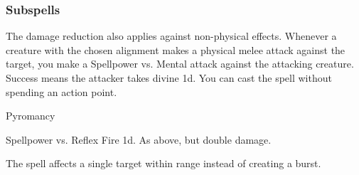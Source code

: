 \subsubsection{Subspells}
The damage reduction also applies against non-physical effects.
Whenever a creature with the chosen alignment makes a physical melee attack against the target, you make a Spellpower vs. Mental attack against the attacking creature.
Success means the attacker takes divine  \minus1d.
You can cast the spell without spending an action point.
\begin{spellsection}{Pyromancy}
\begin{spellheader}
\end{spellheader}
\begin{spellcontent}
\begin{spelltargetinginfo}
\end{spelltargetinginfo}
\begin{spelleffects}
\begin{spellattack}{Spellpower vs. Reflex}
\spellsuccess Fire  \minus1d.
\spellcritical As above, but double damage.
\end{spellattack}
\end{spelleffects}
\end{spellcontent}
\begin{spellfooter}
\end{spellfooter}
\begin{spellsubcontent}
\begin{spellcantrip}
The spell affects a single target within range instead of creating a burst.
\end{spellcantrip}
\end{spellsubcontent}
\end{spellsection}
